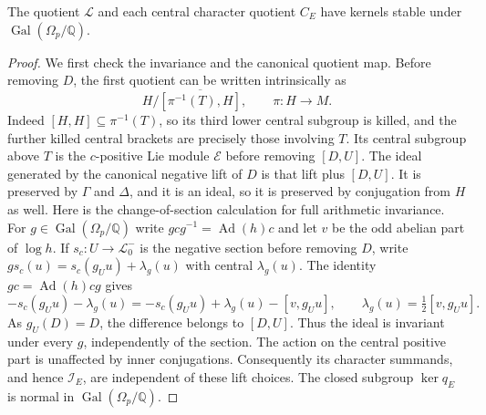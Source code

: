 \begin{lemma}\label{lem:class-two-invariance}
The quotient $\mathcal L$ and each central character quotient $C_E$ have kernels stable under $\operatorname{Gal}(\Omega_p/\mathbb Q)$.
\end{lemma}
\begin{proof}
We first check the invariance and the canonical quotient map.
Before removing $D$, the first quotient can be written
intrinsically as
\[
 H/\overline{[\pi^{-1}(T),H]},\qquad \pi:H\longrightarrow M.
\]
Indeed $[H,H]\subseteq\pi^{-1}(T)$, so its third lower
central subgroup is killed, and the further killed central
brackets are precisely those involving $T$.
Its central subgroup above $T$ is the $c$-positive Lie
module $\mathcal E$ before removing $[D,U]$.
The ideal generated by the canonical negative lift of $D$
is that lift plus $[D,U]$.
It is preserved by $\Gamma$ and $\Delta$, and it is an ideal,
so it is preserved by conjugation from $H$ as well.
Here is the change-of-section calculation for full arithmetic
invariance. For $g\in\operatorname{Gal}(\Omega_p/\mathbb Q)$ write
$gcg^{-1}=\operatorname{Ad}(h)c$ and let $v$ be the odd abelian
part of $\log h$. If $s_c:U\to\mathcal L_0^-$ is the negative
section before removing $D$, write
$g s_c(u)=s_c(g_Uu)+\lambda_g(u)$ with central $\lambda_g(u)$.
The identity $gc=\operatorname{Ad}(h)cg$ gives
\[
 -s_c(g_Uu)-\lambda_g(u)
 =-s_c(g_Uu)+\lambda_g(u)-[v,g_Uu],
 \qquad \lambda_g(u)=\tfrac12[v,g_Uu].
\]
As $g_U(D)=D$, the difference belongs to $[D,U]$. Thus the
ideal is invariant under every $g$, independently of the section.
The action on the central positive part is unaffected by inner
conjugations.  Consequently
its character summands, and hence $\mathcal I_E$, are
independent of these lift choices.  The closed subgroup
$\ker q_E$ is normal in $\operatorname{Gal}(\Omega_p/\mathbb Q)$.

\end{proof}

